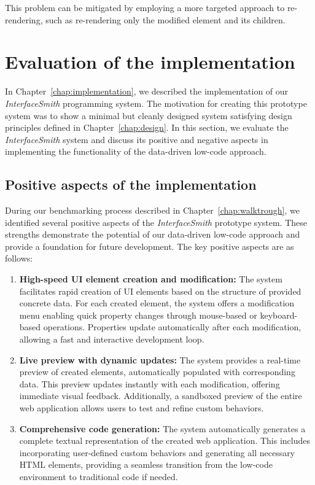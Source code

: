 \begin{enumerate}
	      This problem can be mitigated by employing a more targeted approach to re-rendering, such as re-rendering only the modified element and its children.

\end{enumerate}

\section{Evaluation of the implementation}

In Chapter~\ref{chap:implementation}, we described the implementation of our \emph{InterfaceSmith} programming system.
The motivation for creating this prototype system was to show a minimal but cleanly designed system satisfying design principles defined in Chapter~\ref{chap:design}.
In this section, we evaluate the \emph{InterfaceSmith} system and discuss its positive and negative aspects in implementing the functionality of the data-driven low-code approach.

\subsection{Positive aspects of the implementation}
During our benchmarking process described in Chapter~\ref{chap:walktrough},
we identified several positive aspects of the \emph{InterfaceSmith} prototype system.
These strengths demonstrate the potential of our data-driven low-code approach and provide a foundation for future development.
The key positive aspects are as follows:
\begin{enumerate}
	\item \textbf{High-speed UI element creation and modification:}
	      The system facilitates rapid creation of UI elements based on the structure of provided concrete data.
	      For each created element, the system offers a modification menu enabling quick property changes through mouse-based or keyboard-based operations.
	      Properties update automatically after each modification, allowing a fast and interactive development loop.
	\item \textbf{Live preview with dynamic updates:}
	      The system provides a real-time preview of created elements, automatically populated with corresponding data.
	      This preview updates instantly with each modification, offering immediate visual feedback.
	      Additionally, a sandboxed preview of the entire web application allows users to test and refine custom behaviors.
	\item \textbf{Comprehensive code generation:}
	      The system automatically generates a complete textual representation of the created web application.
	      This includes incorporating user-defined custom behaviors and generating all necessary HTML elements,
	      providing a seamless transition from the low-code environment to traditional code if needed.
\end{enumerate}



